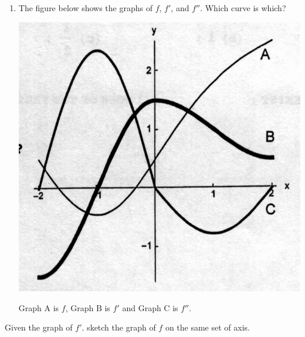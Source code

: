 \documentclass[nooutcomes]{ximera}
\begin{document}
\begin{problem}
\begin{enumerate}
    \item
      The figure below shows the graphs of $f$, $f'$, and $f''$.
      Which curve is which?
      \begin{image}
        \includegraphics[scale = 0.3]{figure2.png}
      \end{image}
      \begin{freeResponse}
        Graph A is $f$, Graph B is $f'$ and Graph C is $f''$.
      \end{freeResponse}


  \end{enumerate}
\end{problem}

	
	
	
\begin{problem}
Given the graph of $f'$. sketch the graph of $f$ on the same set of axis.

\begin{freeResponse}

	
	
	
\end{freeResponse}

	





\end{problem}




								
				
				
	
\end{document}
